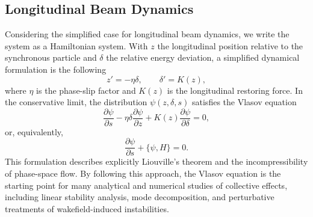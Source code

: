 \documentclass[11pt,a4paper]{article}
\begin{document}
\begin{sloppypar}
\subsection{Longitudinal Beam Dynamics}
Considering the simplified case for longitudinal beam dynamics, we write the system as a Hamiltonian system. With $z$ the longitudinal position relative to the synchronous particle and $\delta$ the relative energy deviation, a simplified dynamical formulation is the following
\begin{equation}
    z'=-\eta\delta,\qquad \delta'=K(z),
    \label{eq:longitudinal_hamiltonian_equations}
\end{equation}
where $\eta$ is the phase-slip factor and $K(z)$ is the longitudinal restoring force. In the conservative limit, the distribution $\psi(z,\delta,s)$ satisfies the Vlasov equation
\begin{equation}
    \frac{\partial \psi}{\partial s}-\eta\delta\frac{\partial \psi}{\partial z}+K(z)\frac{\partial \psi}{\partial \delta}=0,
    \label{eq:vlasov_revised}
\end{equation}
or, equivalently,
\begin{equation}
    \frac{\partial \psi}{\partial s}+\{\psi,H\}=0.
    \label{eq:vlasov_hamiltonian_revised}
\end{equation}
This formulation describes explicitly Liouville's theorem and the incompressibility of phase-space flow. By following this approach, the Vlasov equation is the starting point for many analytical and numerical studies of collective effects, including linear stability analysis, mode decomposition, and perturbative treatments of wakefield-induced instabilities.


\end{sloppypar}
\end{document}
